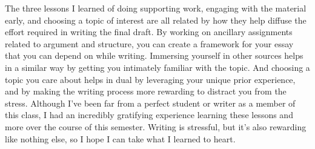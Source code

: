 \documentclass[12pt, letterpaper]{article}
\begin{document}
\begin{mla}
The three lessons I learned of doing supporting work, engaging with the
material early, and choosing a topic of interest are all related by how they
help diffuse the effort required in writing the final draft. By working on
ancillary assignments related to argument and structure, you can create a
framework for your essay that you can depend on while writing. Immersing
yourself in other sources helps in a similar way by getting you intimately
familiar with the topic. And choosing a topic you care about helps in dual
by leveraging your unique prior experience, and by making the writing process
more rewarding to distract you from the stress. Although I've been far from a
perfect student or writer as a member of this class, I had an incredibly
gratifying experience learning these lessons and more over the course of this
semester. Writing is stressful, but it's also rewarding like nothing else, so
I hope I can take what I learned to heart.


\end{mla}
\end{document}

